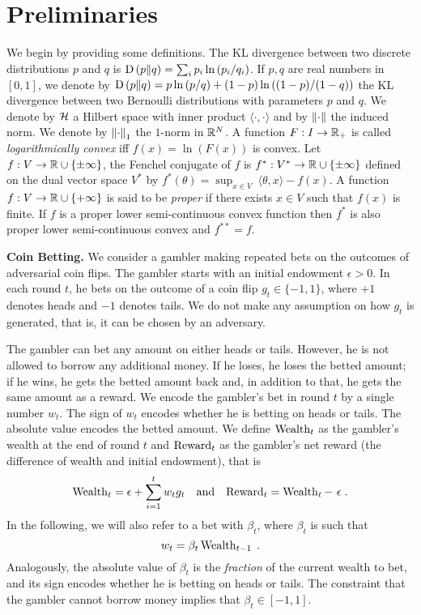 \section{Preliminaries}
\label{section:preliminaries}

We begin by providing some definitions.  The \ac{KL} divergence between two
discrete distributions $p$ and $q$ is $\operatorname{D}\left({p}\middle\|{q}\right) = \sum_{i} p_i \ln\left(
p_i/q_i \right)$. If $p,q$ are real numbers in $[0,1]$, we denote by $\operatorname{D}\left({p}\middle\|{q}\right)
= p \ln \left(p/q \right) + (1-p) \ln \left((1-p)/(1-q) \right)$ the \ac{KL}
divergence between two Bernoulli distributions with parameters $p$ and $q$.  We
denote by $\mathcal{H}$ a Hilbert space with inner product $\langle \cdot, \cdot\rangle$
and by $\left\|{\cdot}\right\|$ the induced norm.  We denote by $\left\|{\cdot}\right\|_1$ the
$1$-norm in $\mathbb{R}^N$.  A function $F:I \to \mathbb{R}_+$ is called \emph{logarithmically
convex} iff $f(x) = \ln(F(x))$ is convex.  Let $f:V \to \mathbb{R} \cup \{\pm\infty\}$,
the Fenchel conjugate of $f$ is $f^*:V^* \to \mathbb{R} \cup \{\pm \infty\}$ defined on
the dual vector space $V^*$ by $f^*(\theta) = \sup_{x \in V} \ \langle \theta,
x \rangle - f(x)$.  A function $f:V \to \mathbb{R} \cup \{+\infty\}$ is said to be
\emph{proper} if there exists $x \in V$ such that $f(x)$ is finite.  If $f$ is
a proper lower semi-continuous convex function then $f^*$ is also proper lower
semi-continuous convex and $f^{**}=f$.

\textbf{Coin Betting.} We consider a gambler making repeated bets on the
outcomes of adversarial coin flips. The gambler starts with an initial
endowment $\epsilon > 0$. In each round $t$, he bets on the outcome of a coin
flip $g_t \in \{-1,1\}$, where $+1$ denotes heads and $-1$ denotes tails.  We
do not make any assumption on how $g_t$ is generated, that is, it can be chosen
by an adversary.

The gambler can bet any amount on either heads or tails. However, he is not
allowed to borrow any additional money. If he loses, he loses the betted
amount; if he wins, he gets the betted amount back and, in addition to that, he
gets the same amount as a reward.  We encode the gambler's bet in round $t$ by a
single number $w_t$. The sign of $w_t$ encodes whether he is
betting on heads or tails. The absolute value encodes the betted amount.
We define $\operatorname{Wealth}_t$ as the gambler's wealth at the end of round $t$ and $\operatorname{Reward}_t$ as the gambler's net reward
(the difference of wealth and initial endowment), that is 
\begin{align}
\label{equation:def_wealth_reward}
\operatorname{Wealth}_t=\epsilon+\sum_{i=1}^t w_t g_t &
& \text{and} &
& \operatorname{Reward}_t = \operatorname{Wealth}_t - \ \epsilon \; .
\end{align}
In the following, we will also refer to a bet with $\beta_t$, where $\beta_t$ is such that
\begin{equation}
\label{equation:def_wt}
w_t = \beta_t \operatorname{Wealth}_{t-1} \; .
\end{equation}
Analogously, the absolute value of $\beta_t$ is the \emph{fraction} of the current wealth to bet, and its sign encodes whether he is
betting on heads or tails. The constraint that the gambler cannot borrow money implies that $\beta_t \in [-1,1]$.


